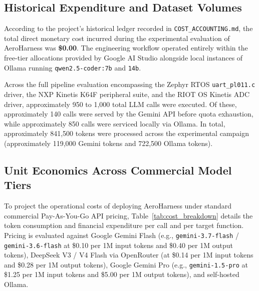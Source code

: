 \documentclass[11pt,a4paper]{article}
\begin{document}
\subsection{Historical Expenditure and Dataset Volumes}

According to the project's historical ledger recorded in \texttt{COST\_ACCOUNTING.md}, the total direct monetary cost incurred during the experimental evaluation of AeroHarness was \textbf{\$0.00}. The engineering workflow operated entirely within the free-tier allocations provided by Google AI Studio alongside local instances of Ollama running \texttt{qwen2.5-coder:7b} and \texttt{14b}.

Across the full pipeline evaluation encompassing the Zephyr RTOS \texttt{uart\_pl011.c} driver, the NXP Kinetis K64F peripheral suite, and the RIOT OS Kinetis ADC driver, approximately 950 to 1,000 total LLM calls were executed. Of these, approximately 140 calls were served by the Gemini API before quota exhaustion, while approximately 850 calls were serviced locally via Ollama. In total, approximately 841,500 tokens were processed across the experimental campaign (approximately 119,000 Gemini tokens and 722,500 Ollama tokens).

\subsection{Unit Economics Across Commercial Model Tiers}

To project the operational costs of deploying AeroHarness under standard commercial Pay-As-You-Go API pricing, Table~\ref{tab:cost_breakdown} details the token consumption and financial expenditure per call and per target function. Pricing is evaluated against Google Gemini Flash (e.g., \texttt{gemini-3.7-flash} / \texttt{gemini-3.6-flash} at \$0.10 per 1M input tokens and \$0.40 per 1M output tokens), DeepSeek V3 / V4 Flash via OpenRouter (at \$0.14 per 1M input tokens and \$0.28 per 1M output tokens), Google Gemini Pro (e.g., \texttt{gemini-1.5-pro} at \$1.25 per 1M input tokens and \$5.00 per 1M output tokens), and self-hosted Ollama.
\end{document}
